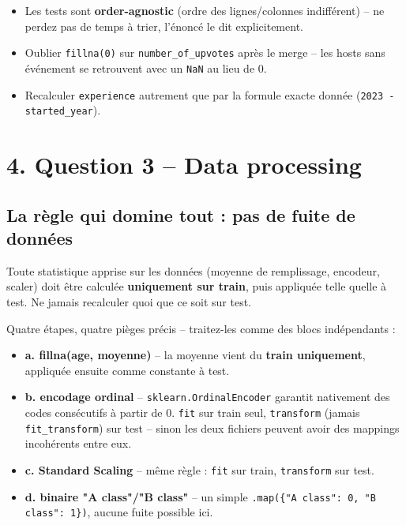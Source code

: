 \documentclass[11pt]{article}
\newcommand{\exhead}[1]{\subsection{#1}}
\begin{document}
\begin{trap}
\begin{itemize}[nosep]
  \item Les tests sont \textbf{order-agnostic} (ordre des lignes/colonnes
        indiff\'erent) -- ne perdez pas de temps \`a trier, l'\'enonc\'e le
        dit explicitement.
  \item Oublier \texttt{fillna(0)} sur \texttt{number\_of\_upvotes} apr\`es
        le merge -- les hosts sans \'ev\'enement se retrouvent avec
        un \texttt{NaN} au lieu de 0.
  \item Recalculer \texttt{experience} autrement que par la formule
        exacte donn\'ee (\texttt{2023 - started\_year}).
\end{itemize}
\end{trap}

\section{4. Question 3 -- Data processing}

\exhead{La r\`egle qui domine tout : pas de fuite de donn\'ees}
Toute statistique apprise sur les donn\'ees (moyenne de remplissage,
encodeur, scaler) doit \^etre calcul\'ee \textbf{uniquement sur train},
puis appliqu\'ee telle quelle \`a test. Ne jamais recalculer quoi que ce
soit sur test.

\begin{explik}
Quatre \'etapes, quatre pi\`eges pr\'ecis -- traitez-les comme des blocs
ind\'ependants :
\begin{itemize}[nosep]
  \item \textbf{a. fillna(age, moyenne)} -- la moyenne vient du
        \textbf{train uniquement}, appliqu\'ee ensuite comme constante \`a
        test.
  \item \textbf{b. encodage ordinal} -- \texttt{sklearn.OrdinalEncoder}
        garantit nativement des codes cons\'ecutifs \`a partir de 0.
        \texttt{fit} sur train seul, \texttt{transform} (jamais
        \texttt{fit\_transform}) sur test -- sinon les deux fichiers
        peuvent avoir des mappings incoh\'erents entre eux.
  \item \textbf{c. Standard Scaling} -- m\^eme r\`egle : \texttt{fit} sur
        train, \texttt{transform} sur test.
  \item \textbf{d. binaire "A class"/"B class"} -- un simple
        \texttt{.map(\{"A class": 0, "B class": 1\})}, aucune fuite
        possible ici.
\end{itemize}
\end{explik}
\end{document}
